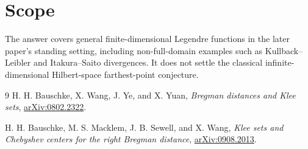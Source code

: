 \documentclass[10pt]{article}
\begin{document}
\section*{Scope}
The answer covers general finite-dimensional Legendre functions in the later
paper's standing setting, including non-full-domain examples such as
Kullback--Leibler and Itakura--Saito divergences.  It does not settle the
classical infinite-dimensional Hilbert-space farthest-point conjecture.

\begin{thebibliography}{9}
H. H. Bauschke, X. Wang, J. Ye, and X. Yuan,
\emph{Bregman distances and Klee sets},
\href{https://arxiv.org/abs/0802.2322}{arXiv:0802.2322}.

H. H. Bauschke, M. S. Macklem, J. B. Sewell, and X. Wang,
\emph{Klee sets and Chebyshev centers for the right Bregman distance},
\href{https://arxiv.org/abs/0908.2013}{arXiv:0908.2013}.
\end{thebibliography}
\end{document}
